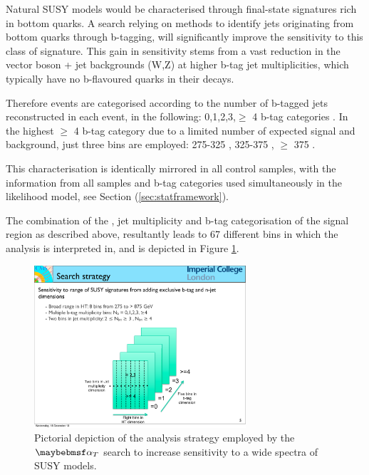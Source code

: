 \begin{itemize}
Natural \ac{SUSY} models would be characterised through final-state signatures rich in bottom quarks. A search relying on methods to identify jets originating from bottom quarks through b-tagging, will significantly improve the sensitivity to this class of signature. This gain in sensitivity stems from a vast reduction in the vector boson + jet backgrounds (W,Z) at higher b-tag jet multiplicities, which typically have no b-flavoured quarks in their decays.  

Therefore events are categorised according to the number of b-tagged jets reconstructed in each event, in the following: 0,1,2,3,$\geq$ 4 b-tag categories . In the highest $\geq$ 4 b-tag category due to a limited number of expected signal and background, just three \theht bins are employed: 275-325 \GeV, 325-375 \GeV, $\geq$ 375 \GeV.

This characterisation is identically mirrored in all control samples, with the information from all samples and b-tag categories used simultaneously in the likelihood model, see Section (\ref{sec:statframework}).

\end{itemize}
 
 The combination of the \theht, jet multiplicity and b-tag categorisation of the signal region as described above, resultantly leads to 67 different bins in which the analysis is interpreted in, and is depicted in Figure \ref{fig:analysisbinning}. 
 
 \begin{figure}[!h]
 \centering
\includegraphics[width=0.70\textwidth]{plots/analysis_binning.pdf}
\caption[Pictorial depiction of the analysis strategy employed by the $\alphat$ search to increase sensitivity to a wide spectra of \ac{SUSY} models.]{Pictorial depiction of the analysis strategy employed by the $\alphat$ search to increase sensitivity to a wide spectra of \ac{SUSY} models.}  
\label{fig:analysisbinning}
\end{figure}
\FloatBarrier

